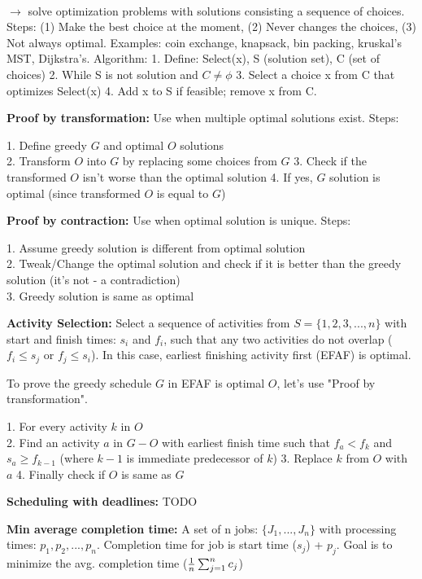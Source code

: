 \\
$\rightarrow$ solve optimization problems with solutions consisting a sequence of choices.
Steps:
(1) Make the best choice at the moment,
(2) Never changes the choices,
(3) Not always optimal.
Examples: coin exchange, knapsack, bin packing, kruskal's MST, Dijkstra's.
Algorithm:
1. Define: Select(x), S (solution set), C (set of choices)
2. While S is not solution and $C \neq \phi$
3. Select a choice x from C that optimizes Select(x)
4. Add x to S if feasible; remove x from C.

\textbf{Proof by transformation:} Use when multiple optimal solutions exist. Steps:

1. Define greedy $G$ and optimal $O$ solutions\\
2. Transform $O$ into $G$ by replacing some choices from $G$
3. Check if the transformed $O$ isn't worse than the optimal solution
4. If yes, $G$ solution is optimal (since transformed $O$ is equal to $G$)

\textbf{Proof by contraction:} Use when optimal solution is unique. Steps:

1. Assume greedy solution is different from optimal solution\\
2. Tweak/Change the optimal solution and check if it is better than the greedy solution (it's not - a contradiction)\\
3. Greedy solution is same as optimal

\textbf{Activity Selection:} Select a sequence of activities from $S = \{1,2,3,...,n\}$ with start and finish times: $s_i$ and $f_i$, such that any two activities do not overlap ($f_i \le s_j$ or $f_j \le s_i$). In this case, earliest finishing activity first (EFAF) is optimal.

To prove the greedy schedule $G$ in EFAF is optimal $O$, let's use "Proof by transformation". 

1. For every activity $k$ in $O$\\
2. Find an activity $a$ in $G-O$ with earliest finish time such that $f_a < f_k$ and $s_a \ge f_{k-1}$ (where $k-1$ is immediate predecessor of $k$)
3. Replace $k$ from $O$ with $a$
4. Finally check if $O$ is same as $G$

\textbf{Scheduling with deadlines:} TODO

\textbf{Min average completion time:} A set of n jobs: $\{J_1,...,J_n\}$ with processing times: $p_1,p_2,...,p_n$. Completion time for job is start time ($s_j$) + $p_j$. Goal is to minimize the avg. completion time (${1 \over n} \sum_{j=1}^{n} c_j$) 

